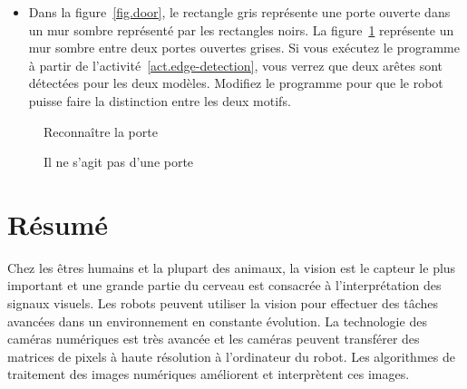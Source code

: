 \begin{framed}
\begin{itemize}
\item Dans la figure~\ref{fig.door}, le rectangle gris représente une porte ouverte dans un mur sombre représenté par les rectangles noirs. La figure~\ref{fig.not-a-door} représente un mur sombre entre deux portes ouvertes grises. Si vous exécutez le programme à partir de l'activité~\ref{act.edge-detection}, vous verrez que deux arêtes sont détectées pour les deux modèles. Modifiez le programme pour que le robot puisse faire la distinction entre les deux motifs.
\end{itemize}
\end{framed}

\begin{figure}
\begin{minipage}{.45\textwidth}
\caption{Reconnaître la porte}\label{fig.door}
\end{minipage}
\hspace{\fill}
\begin{minipage}{.45\textwidth}
\caption{Il ne s'agit pas d'une porte}\label{fig.not-a-door}
\end{minipage}
\end{figure}

\section{Résumé}

Chez les êtres humains et la plupart des animaux, la vision est le capteur le plus important et une grande partie du cerveau est consacrée à l'interprétation des signaux visuels. Les robots peuvent utiliser la vision pour effectuer des tâches avancées dans un environnement en constante évolution. La technologie des caméras numériques est très avancée et les caméras peuvent transférer des matrices de pixels à haute résolution à l'ordinateur du robot. Les algorithmes de traitement des images numériques améliorent et interprètent ces images.

